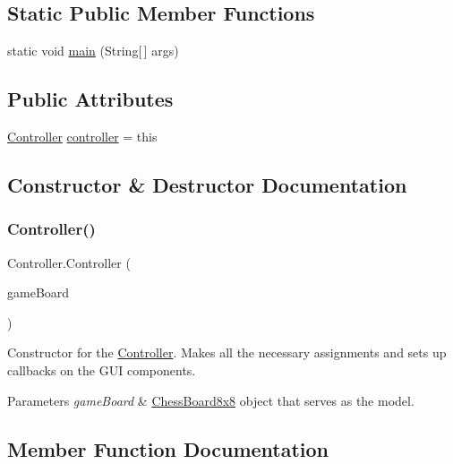 \subsection*{Static Public Member Functions}
\begin{DoxyCompactItemize}
\item 
static void \mbox{\hyperlink{class_controller_a173fe03517370b8cbd226184a1a4554a}{main}} (String\mbox{[}$\,$\mbox{]} args)
\end{DoxyCompactItemize}
\subsection*{Public Attributes}
\begin{DoxyCompactItemize}
\item 
\mbox{\hyperlink{class_controller}{Controller}} \mbox{\hyperlink{class_controller_ac9eee5848fbbb6719d5cc24475fc03ae}{controller}} = this
\end{DoxyCompactItemize}


\subsection{Constructor \& Destructor Documentation}
\mbox{\label{class_controller_a5f680484b02e9b5009af214730425710}} 
\subsubsection{\texorpdfstring{Controller()}{Controller()}}
{\footnotesize\ttfamily Controller.\+Controller (\begin{DoxyParamCaption}\item[{\mbox{\hyperlink{class_chess_board8x8}{Chess\+Board8x8}}}]{game\+Board }\end{DoxyParamCaption})}

Constructor for the \mbox{\hyperlink{class_controller}{Controller}}. Makes all the necessary assignments and sets up callbacks on the G\+UI components. 
\begin{DoxyParams}{Parameters}
{\em game\+Board} & \mbox{\hyperlink{class_chess_board8x8}{Chess\+Board8x8}} object that serves as the model. \\
\hline
\end{DoxyParams}


\subsection{Member Function Documentation}
\mbox{\label{class_controller_a47ff273223f53707d8c5a8f151b7f03b}} 
